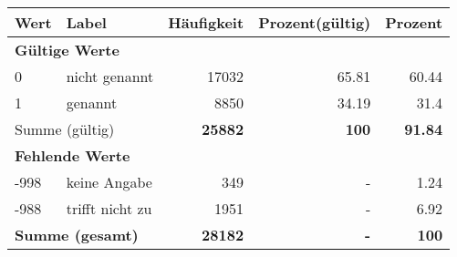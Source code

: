      \begin{longtable}{lXrrr}
     \toprule
     \textbf{Wert} & \textbf{Label} & \textbf{Häufigkeit} & \textbf{Prozent(gültig)} & \textbf{Prozent} \\
     \endhead
     \midrule
     \multicolumn{5}{l}{\textbf{Gültige Werte}}\\

     0 &
     \multicolumn{1}{X}{ nicht genannt   } &


       \num{17032} &
       \num[round-mode=places,round-precision=2]{65.81} &
         \num[round-mode=places,round-precision=2]{60.44} \\

     1 &
     \multicolumn{1}{X}{ genannt   } &


       \num{8850} &
       \num[round-mode=places,round-precision=2]{34.19} &
         \num[round-mode=places,round-precision=2]{31.4} \\
     \midrule
     \multicolumn{2}{l}{Summe (gültig)} &
       \textbf{\num{25882}} &
     \textbf{100} &
       \textbf{\num[round-mode=places,round-precision=2]{91.84}} \\
     \multicolumn{5}{l}{\textbf{Fehlende Werte}}\\
       -998 &
       keine Angabe &
         \num{349} &
        - &
         \num[round-mode=places,round-precision=2]{1.24} \\
       -988 &
       trifft nicht zu &
         \num{1951} &
        - &
         \num[round-mode=places,round-precision=2]{6.92} \\
     \midrule
     \multicolumn{2}{l}{\textbf{Summe (gesamt)}} &
          \textbf{\num{28182}} &
        \textbf{-} &
        \textbf{100} \\
     \bottomrule
     \end{longtable}
     
